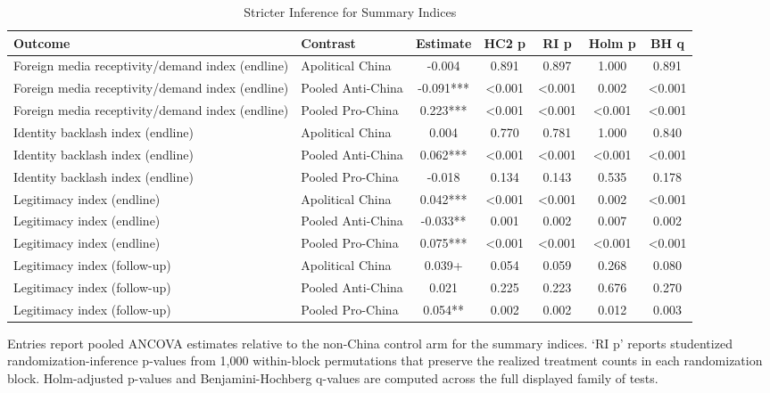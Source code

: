 \begin{table}[H]
\centering
\caption{Stricter Inference for Summary Indices}
\label{tab:summary_indices_strict}
\footnotesize
\begin{threeparttable}
\begin{tabular}{llccccc}
\toprule
Outcome & Contrast & Estimate & HC2 p & RI p & Holm p & BH q \\
\midrule
Foreign media receptivity/demand index (endline) & Apolitical China & -0.004 & 0.891 & 0.897 & 1.000 & 0.891 \\
Foreign media receptivity/demand index (endline) & Pooled Anti-China & -0.091*** & <0.001 & <0.001 & 0.002 & <0.001 \\
Foreign media receptivity/demand index (endline) & Pooled Pro-China & 0.223*** & <0.001 & <0.001 & <0.001 & <0.001 \\
Identity backlash index (endline) & Apolitical China & 0.004 & 0.770 & 0.781 & 1.000 & 0.840 \\
Identity backlash index (endline) & Pooled Anti-China & 0.062*** & <0.001 & <0.001 & <0.001 & <0.001 \\
Identity backlash index (endline) & Pooled Pro-China & -0.018 & 0.134 & 0.143 & 0.535 & 0.178 \\
Legitimacy index (endline) & Apolitical China & 0.042*** & <0.001 & <0.001 & 0.002 & <0.001 \\
Legitimacy index (endline) & Pooled Anti-China & -0.033** & 0.001 & 0.002 & 0.007 & 0.002 \\
Legitimacy index (endline) & Pooled Pro-China & 0.075*** & <0.001 & <0.001 & <0.001 & <0.001 \\
Legitimacy index (follow-up) & Apolitical China & 0.039+ & 0.054 & 0.059 & 0.268 & 0.080 \\
Legitimacy index (follow-up) & Pooled Anti-China & 0.021 & 0.225 & 0.223 & 0.676 & 0.270 \\
Legitimacy index (follow-up) & Pooled Pro-China & 0.054** & 0.002 & 0.002 & 0.012 & 0.003 \\
\bottomrule
\end{tabular}
\begin{tablenotes}[flushleft]
\footnotesize
\item Entries report pooled ANCOVA estimates relative to the non-China control arm for the summary indices. `RI p' reports studentized randomization-inference p-values from 1,000 within-block permutations that preserve the realized treatment counts in each randomization block. Holm-adjusted p-values and Benjamini-Hochberg q-values are computed across the full displayed family of tests.
\end{tablenotes}
\end{threeparttable}
\end{table}
